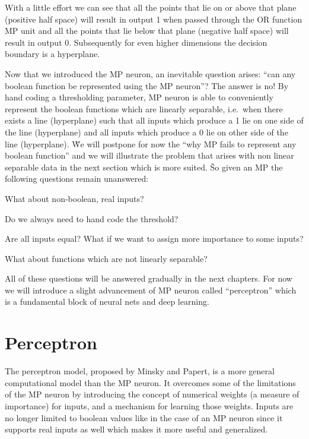 
With a little effort we can see that all the points that lie on or above that plane (positive half space) will result
in output 1 when passed through the OR function MP unit and all the points that lie below that plane (negative half
space) will result in output 0. Subsequently for even higher dimensions the decision boundary is a hyperplane.
\ee

Now that we introduced the MP neuron, an inevitable question arises: ``can any boolean function be represented using
the MP neuron''? The answer is no! By hand coding a thresholding parameter, MP neuron is able to conveniently
represent the boolean functions which are linearly separable, i.e.\ when there exists a line (hyperplane) such that
all inputs which produce a 1 lie on one side of the line (hyperplane) and all inputs which produce a 0 lie on other
side of the line (hyperplane). \v

We will postpone for now the ``why MP fails to represent any boolean function'' and we will illustrate the problem
that arises with non linear separable data in the next section which is more suited. \v

So given an MP the following questions remain unanswered:
\bit
\item What about non-boolean, real inputs?
\item Do we always need to hand code the threshold?
\item Are all inputs equal? What if we want to assign more importance to some inputs?
\item What about functions which are not linearly separable?
\eit

All of these questions will be answered gradually in the next chapters. For now we will introduce a slight
advancement of MP neuron called ``perceptron'' which is a fundamental block of neural nets and deep learning.

\section{Perceptron}

The perceptron model, proposed by Minsky and Papert, is a more general computational model than the MP neuron. It
overcomes some of the limitations of the MP neuron by introducing the concept of numerical weights (a measure of
importance) for inputs, and a mechanism for learning those weights. Inputs are no longer limited to boolean values
like in the case of an MP neuron since it supports real inputs as well which makes it more useful and generalized.

